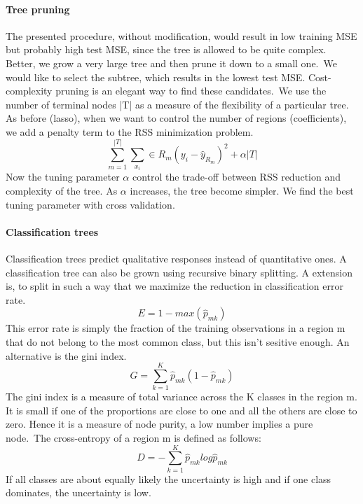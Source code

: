 \documentclass[../document.tex]{subfiles}
\begin{document}
	\paragraph{Tree pruning}
	The presented procedure, without modification, would result in low training MSE but probably high test MSE, since the tree is allowed to be quite complex. Better, we grow a very large tree and then prune it down to a small one.\
	We would like to select the subtree, which results in the lowest test MSE. Cost-complexity pruning is an elegant way to find these candidates.\
	We use the number of terminal nodes |T| as a measure of the flexibility of a particular tree. As before (lasso), when we want to control the number of regions (coefficients), we add a penalty term to the RSS minimization problem.
	\begin{equation}
		\sum_{m=1}^{|T|}\sum_{x_{i}} \in R_{m}(y_{i}-\hat{y}_{R_{m}})^2 + \alpha|T|
	\end{equation}
	Now the tuning parameter \(\alpha\) control the trade-off between RSS reduction and complexity of the tree. As \(\alpha\) increases, the tree become simpler. We find the best tuning parameter with cross validation.
	\paragraph{Classification trees}
	Classification trees predict qualitative responses instead of quantitative ones. A classification tree can also be grown using recursive binary splitting. A extension is, to split in such a way that we maximize the reduction in classification error rate.
	\begin{equation}
		E = 1-max(\hat{p}_{mk})
	\end{equation}
	This error rate is simply the fraction of the training observations in a region m that do not belong to the most common class, but this isn't sesitive enough. An alternative is the gini index.
	\begin{equation}
		G = \sum_{k=1}^{K}\hat{p}_{mk}(1-\hat{p}_{mk})
	\end{equation}
	The gini index is a measure of total variance across the K classes in the region m. It is small if one of the proportions are close to one and all the others are close to zero. Hence it is a measure of node purity, a low number implies a pure node.\
	The cross-entropy of a region m is defined as follows:
	\begin{equation}
		D = -\sum_{k=1}^{K}\hat{p}_{mk}log\hat{p}_{mk}
	\end{equation}
	If all classes are about equally likely the uncertainty is high and if one class dominates, the uncertainty is low.
\end{document}
